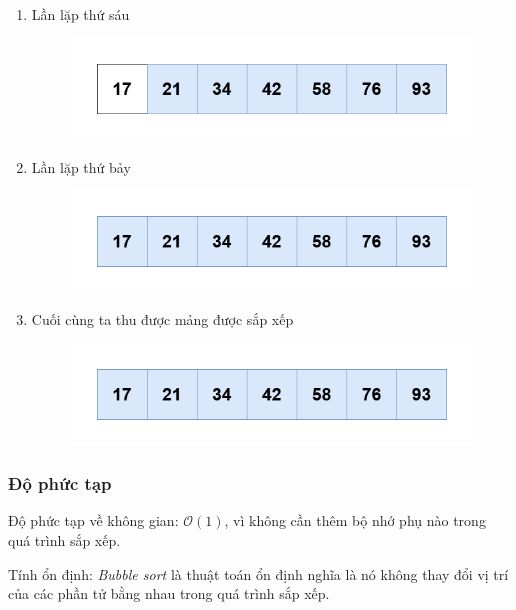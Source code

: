 \begin{enumerate}
    \item Lần lặp thứ sáu
    \begin{figure}[H]
        \centering
        \includegraphics[width=0.75\linewidth]{img/bubble_sort/27.png}
    \end{figure}

    \item Lần lặp thứ bảy
    \begin{figure}[H]
        \centering
        \includegraphics[width=0.75\linewidth]{img/bubble_sort/28.png}
    \end{figure}

    \item Cuối cùng ta thu được mảng được sắp xếp
    \begin{figure}[H]
        \centering
        \includegraphics[width=0.75\linewidth]{img/bubble_sort/28.png}
    \end{figure}
\end{enumerate}
\newpage
\subsubsection{Độ phức tạp}

    \item[\textbf{--}]Độ phức tạp về không gian:  $\mathcal{O}(1)$, vì không cần thêm bộ nhớ phụ nào trong quá trình sắp xếp.
    \item[\textbf{--}]Tính ổn định: \textit{Bubble sort} là thuật toán ổn định nghĩa là nó không thay đổi vị trí của các phần tử bằng nhau trong quá trình sắp xếp.